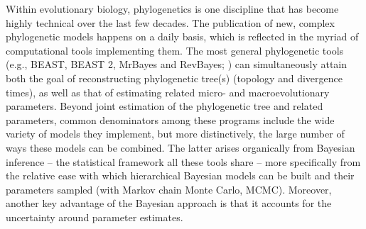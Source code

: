 \documentclass[10pt,letterpaper,table]{article}
\begin{document}
Within evolutionary biology, phylogenetics is one discipline that has
become highly technical over the last few decades.
The publication of new, complex phylogenetic models happens on a
daily basis, which is reflected in the myriad of computational tools
implementing them.
The most general phylogenetic tools (e.g., BEAST, BEAST 2, MrBayes and
RevBayes; \cite{beast,beast2,revbayes,mrbayes}) can simultaneously
attain both the goal of reconstructing phylogenetic tree(s) (topology
and divergence times), as well as that of estimating related micro-
and macroevolutionary parameters. 
Beyond joint estimation of the phylogenetic tree and related
parameters, common denominators among these programs include the wide
variety of models they implement, but more distinctively, the large
number of ways these models can be combined.
The latter arises organically from Bayesian inference -- the
statistical framework all these tools share -- more specifically from
the relative ease with which hierarchical Bayesian models can be 
built and their parameters sampled (with Markov chain Monte Carlo,
MCMC).
Moreover, another key advantage of the Bayesian approach is that it
accounts for the uncertainty around parameter estimates.
\end{document}
